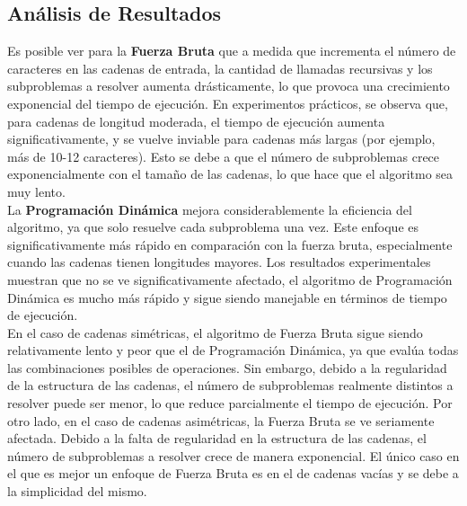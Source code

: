 \begin{figure}[h!]
    \centering
\end{figure}

\newpage
\subsection{Análisis de Resultados}

Es posible ver para la \textbf{Fuerza Bruta} que a medida que incrementa el número de caracteres en las cadenas de entrada, la cantidad de llamadas recursivas y los subproblemas a resolver aumenta drásticamente, lo que provoca una crecimiento exponencial del tiempo de ejecución. En experimentos prácticos, se observa que, para cadenas de longitud moderada, el tiempo de ejecución aumenta significativamente, y se vuelve inviable para cadenas más largas (por ejemplo, más de 10-12 caracteres). Esto se debe a que el número de subproblemas crece exponencialmente con el tamaño de las cadenas, lo que hace que el algoritmo sea muy lento.\\

La \textbf{Programación Dinámica} mejora considerablemente la eficiencia del algoritmo, ya que solo resuelve cada subproblema una vez. Este enfoque es significativamente más rápido en comparación con la fuerza bruta, especialmente cuando las cadenas tienen longitudes mayores. Los resultados experimentales muestran que no se ve significativamente afectado, el algoritmo de Programación Dinámica es mucho más rápido y sigue siendo manejable en términos de tiempo de ejecución.\\

En el caso de cadenas simétricas, el algoritmo de Fuerza Bruta sigue siendo relativamente lento y peor que el de Programación Dinámica, ya que evalúa todas las combinaciones posibles de operaciones. Sin embargo, debido a la regularidad de la estructura de las cadenas, el número de subproblemas realmente distintos a resolver puede ser menor, lo que reduce parcialmente el tiempo de ejecución. Por otro lado, en el caso de cadenas asimétricas, la Fuerza Bruta se ve seriamente afectada. Debido a la falta de regularidad en la estructura de las cadenas, el número de subproblemas a resolver crece de manera exponencial. El único caso en el que es mejor un enfoque de Fuerza Bruta es en el de cadenas vacías y se debe a la simplicidad del mismo.\\
